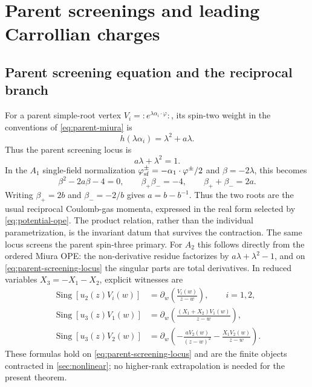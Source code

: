 \documentclass[11pt,a4paper]{article}
\numberwithin{equation}{section}
\theoremstyle{remark}
\newcommand{\Sing}{\operatorname{Sing}}
\begin{document}
\section{Parent screenings and leading Carrollian charges}
\label{sec:parent-leading}

\subsection{Parent screening equation and the reciprocal branch}

For a parent simple-root vertex $V_i=:e^{\lambda\alpha_i\cdot\varphi}:$, its spin-two weight
in the conventions of \cref{eq:parent-miura} is
\begin{equation}
 h(\lambda\alpha_i)=\lambda^2+a\lambda.
 \label{eq:parent-weight}
\end{equation}
Thus the parent screening locus is
\begin{equation}
 a\lambda+\lambda^2=1.
 \label{eq:parent-screening-locus}
\end{equation}
In the $A_1$ single-field normalization
$\varphi_{\rm sf}^{\pm}=-\alpha_1\cdot\varphi^{\pm}/2$ and $\beta=-2\lambda$, this becomes
\begin{equation}
 \beta^2-2a\beta-4=0,
 \qquad \beta_+\beta_-=-4,
 \qquad \beta_++\beta_-=2a.
 \label{eq:reciprocal-parent}
\end{equation}
Writing $\beta_+=2b$ and $\beta_-=-2/b$ gives $a=b-b^{-1}$.  Thus the two roots are the
usual reciprocal Coulomb-gas momenta, expressed in the real form selected by
\cref{eq:potential-ope}.  The product relation, rather than the individual parametrization,
is the invariant datum that survives the contraction.
The same locus screens the parent spin-three primary.  For $A_2$ this follows directly from
the ordered Miura OPE: the non-derivative residue factorizes by
$a\lambda+\lambda^2-1$, and on \cref{eq:parent-screening-locus} the singular parts are total
derivatives.  In reduced variables $X_3=-X_1-X_2$, explicit witnesses are
\begin{align}
 \Sing[u_2(z)V_i(w)]&=\partial_w\left(\frac{V_i(w)}{z-w}\right),
 \qquad i=1,2,
 \label{eq:parent-u2-witness}\\
 \Sing[u_3(z)V_1(w)]&=\partial_w\left(
 \frac{(X_1+X_2)V_1(w)}{z-w}\right),
 \label{eq:parent-u3-root1}\\
 \Sing[u_3(z)V_2(w)]&=\partial_w\left(
 -\frac{aV_2(w)}{(z-w)^2}-\frac{X_1V_2(w)}{z-w}\right).
 \label{eq:parent-u3-root2}
\end{align}
These formulas hold on \cref{eq:parent-screening-locus} and are the finite objects contracted in
\cref{sec:nonlinear}; no higher-rank extrapolation is needed for the present theorem.
\end{document}
